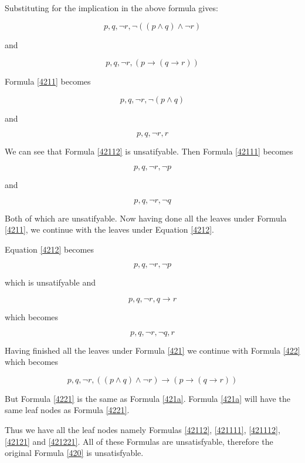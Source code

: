 \documentclass[10pt,a4paper]{article}
\begin{document}
Substituting for the implication in the above formula gives:

\begin{equation}
\label{4211}
p, q, \neg r, \neg (( p \wedge q) \wedge \neg r)
\end{equation}

and

\begin{equation}
\label{4212}
p, q, \neg r, (p \rightarrow ( q \rightarrow r )) 
\end{equation}


Formula \ref{4211} becomes 


\begin{equation}
\label{42111}
p, q, \neg r, \neg ( p \wedge q)
\end{equation}

and 

\begin{equation}
\label{42112}
p, q, \neg r, r
\end{equation}

We can see that Formula \ref{42112} is unsatifyable.  Then Formula \ref{42111} becomes

\begin{equation}
\label{421111}
p, q, \neg r, \neg p 
\end{equation}

and 

\begin{equation}
\label{421112}
p, q, \neg r, \neg q 
\end{equation}

Both of which are unsatifyable. Now having done all the leaves under Formula \ref{4211}, we continue with the leaves under Equation \ref{4212}.

Equation \ref{4212} becomes

\begin{equation}
\label{42121}
p, q, \neg r, \neg p 
\end{equation}

which is unsatifyable and
 
\begin{equation}
\label{42122}
p, q, \neg r, q \rightarrow r 
\end{equation} 

which becomes

\begin{equation}
\label{421221}
p, q, \neg r, \neg q,  r 
\end{equation} 
 
Having finished all the leaves under Formula \ref{421} we continue with Formula \ref{422} which becomes

\begin{equation}
\label{4221}
 p, q, \neg r,  (( p \wedge q) \wedge \neg r) \rightarrow (p \rightarrow ( q \rightarrow r )) 
\end{equation} 

But Formula \ref{4221} is the same as Formula \ref{421a}. Formula \ref{421a} will have the same leaf nodes as Formula \ref{4221}.

Thus we have all the leaf nodes namely Formulas \ref{42112}, \ref{421111}, \ref{421112}, \ref{42121} and \ref{421221}. All of these Formulas are unsatisfyable, 
therefore the original Formula \ref{420} is unsatisfyable.
\end{document}
